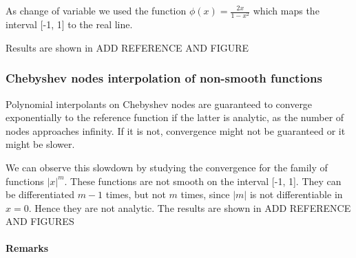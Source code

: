 \documentclass[a4paper,11]{article}
\begin{document}
As change of variable we used the function $\phi(x) = \frac{2x}{1-x^2}$ 
which maps the interval [-1, 1] to the real line.

Results are shown in ADD REFERENCE AND FIGURE

\subsubsection{Chebyshev nodes interpolation of non-smooth functions}

Polynomial interpolants on Chebyshev nodes are guaranteed to converge 
exponentially to the reference function if the latter is analytic, as 
the number of nodes approaches infinity.
If it is not, convergence might not be guaranteed or it might be slower.

We can observe this slowdown by studying the convergence for the
family of functions $|x|^{m}$. These functions are not smooth on the interval
[-1, 1]. They can be differentiated $m-1$ times, but not $m$ times, since 
$|m|$ is not differentiable in $x=0$. Hence they are not analytic.
The results are shown in ADD REFERENCE AND FIGURES

\paragraph{Remarks}
\end{document}
